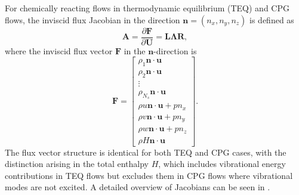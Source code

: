 For chemically reacting flows in thermodynamic equilibrium (\gls{TEQ}) and \gls{CPG} flows, the inviscid flux Jacobian in the direction $\mathbf{n} = (n_x, n_y, n_z)$ is defined as
\begin{equation}
\mathbf{A} = \frac{\partial \mathbf{F}}{\partial \mathbf{U}} = \mathbf{L}\mathbf{\Lambda}\mathbf{R},
\end{equation}
where the inviscid flux vector $\mathbf{F}$ in the $\mathbf{n}$-direction is
\begin{equation}
\mathbf{F} = \begin{bmatrix}
\rho_1 \mathbf{n} \cdot \mathbf{u} \\
\rho_2 \mathbf{n} \cdot \mathbf{u} \\
\vdots \\
\rho_{N_s} \mathbf{n} \cdot \mathbf{u} \\
\rho u \mathbf{n} \cdot \mathbf{u} + p n_x \\
\rho v \mathbf{n} \cdot \mathbf{u} + p n_y \\
\rho w \mathbf{n} \cdot \mathbf{u} + p n_z \\
\rho H \mathbf{n} \cdot \mathbf{u}
\end{bmatrix}.
\end{equation}
The flux vector structure is identical for both \gls{TEQ} and \gls{CPG} cases, with the distinction arising in the total enthalpy $H$, which includes vibrational energy contributions in \gls{TEQ} flows but excludes them in \gls{CPG} flows where vibrational modes are not excited. A detailed overview of Jacobians can be seen in .


